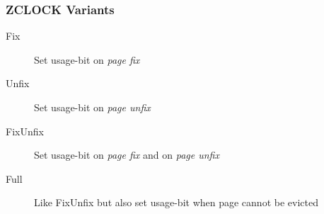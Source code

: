 

\begin{frame}
    \frametitle{ZCLOCK Variants}

    \begin{description}
        \item[Fix] Set usage-bit on \emph{page fix}
        \item[Unfix] Set usage-bit on \emph{page unfix}
        \item[FixUnfix] Set usage-bit on \emph{page fix} and on \emph{page unfix}
        \item[Full] Like \textcolor{structure}{FixUnfix} but also set usage-bit when page cannot be evicted
    \end{description}
\end{frame}

